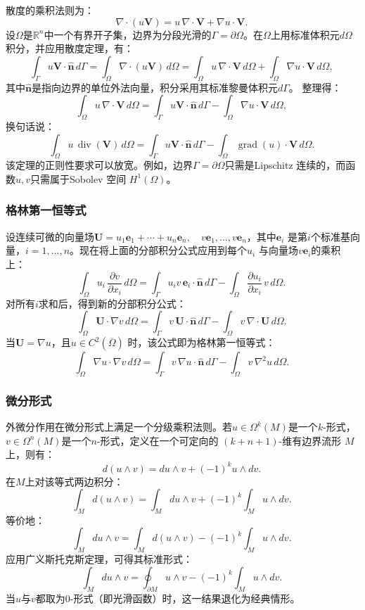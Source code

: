 散度的乘积法则为：
$$
\nabla \cdot (u\mathbf{V}) = u\,\nabla \cdot \mathbf{V} + \nabla u \cdot \mathbf{V}.~
$$
设$\Omega$是$\mathbb{R}^n$中一个有界开子集，边界为分段光滑的$\Gamma = \partial \Omega$。在$\Omega$上用标准体积元$d\Omega$积分，并应用散度定理，有：
$$
\int_{\Gamma} u\mathbf{V} \cdot \hat{\mathbf{n}}\,d\Gamma 
= \int_{\Omega} \nabla \cdot (u\mathbf{V})\,d\Omega
= \int_{\Omega} u\,\nabla \cdot \mathbf{V}\,d\Omega + \int_{\Omega} \nabla u \cdot \mathbf{V}\,d\Omega,~
$$
其中$\hat{\mathbf{n}}$是指向边界的单位外法向量，积分采用其标准黎曼体积元$d\Gamma$。
整理得：
$$
\int_{\Omega} u\,\nabla \cdot \mathbf{V}\,d\Omega 
= \int_{\Gamma} u\mathbf{V}\cdot \hat{\mathbf{n}}\,d\Gamma - \int_{\Omega} \nabla u \cdot \mathbf{V}\,d\Omega,~
$$
换句话说：
$$
\int_{\Omega} u\,\operatorname{div}(\mathbf{V})\,d\Omega
= \int_{\Gamma} u\mathbf{V}\cdot \hat{\mathbf{n}}\,d\Gamma - \int_{\Omega} \operatorname{grad}(u)\cdot \mathbf{V}\,d\Omega.~
$$
该定理的正则性要求可以放宽。例如，边界$\Gamma = \partial \Omega$只需是Lipschitz 连续的，而函数$u, v$只需属于Sobolev 空间 $H^{1}(\Omega)$。
\subsubsection{格林第一恒等式}
设连续可微的向量场$\mathbf{U} = u_{1}\mathbf{e}_{1} + \cdots + u_{n}\mathbf{e}_{n},\quad v\mathbf{e}_{1}, \ldots, v\mathbf{e}_{n}$，其中$\mathbf{e}_{i}$ 是第$i$个标准基向量，$i = 1, \ldots, n$。现在将上面的分部积分公式应用到每个$u_{i}$ 与向量场$v\mathbf{e}_{i}$的乘积上：
$$
\int_{\Omega} u_{i}\,\frac{\partial v}{\partial x_{i}}\,d\Omega
= \int_{\Gamma} u_{i}v\,\mathbf{e}_{i}\cdot \hat{\mathbf{n}}\,d\Gamma
- \int_{\Omega} \frac{\partial u_{i}}{\partial x_{i}}\,v\,d\Omega.~
$$
对所有$i$求和后，得到新的分部积分公式：
$$
\int_{\Omega} \mathbf{U}\cdot \nabla v\,d\Omega
= \int_{\Gamma} v\,\mathbf{U}\cdot \hat{\mathbf{n}}\,d\Gamma
- \int_{\Omega} v\,\nabla \cdot \mathbf{U}\,d\Omega.~
$$
当$\mathbf{U} = \nabla u$，且$u \in C^{2}(\overline{\Omega})$ 时，该公式即为格林第一恒等式：
$$
\int_{\Omega} \nabla u \cdot \nabla v\,d\Omega
= \int_{\Gamma} v\,\nabla u \cdot \hat{\mathbf{n}}\,d\Gamma
- \int_{\Omega} v\,\nabla^{2}u\,d\Omega.~
$$
\subsubsection{微分形式}
外微分作用在微分形式上满足一个分级乘积法则。若$u \in \Omega^{k}(M)$是一个$k$-形式，$v \in \Omega^{n}(M)$是一个$n$-形式，定义在一个可定向的 $(k+n+1)$-维有边界流形 $M$ 上，则有：
$$
d(u \wedge v) = du \wedge v + (-1)^{k} u \wedge dv.~
$$
在$M$上对该等式两边积分：
$$
\int_{M} d(u \wedge v) = \int_{M} du \wedge v + (-1)^{k} \int_{M} u \wedge dv.~
$$
等价地：
$$
\int_{M} du \wedge v = \int_{M} d(u \wedge v) - (-1)^{k} \int_{M} u \wedge dv.~
$$
应用广义斯托克斯定理，可得其标准形式：
$$
\int_{M} du \wedge v = \oint_{\partial M} u \wedge v - (-1)^{k} \int_{M} u \wedge dv.~
$$
当$u$与$v$都取为0-形式（即光滑函数）时，这一结果退化为经典情形。

